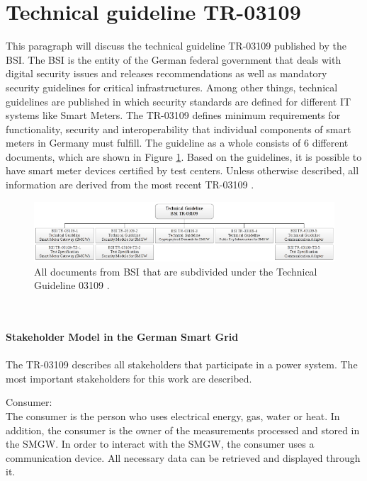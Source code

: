 \section{Technical guideline TR-03109}
\label{sec:TR_03109}
This paragraph will discuss the technical guideline \gls{TR-03109} published by the \gls{BSI}. The \gls{BSI} is the entity of the German federal government that deals with digital security issues and releases recommendations as well as mandatory security guidelines for critical infrastructures. Among other things, technical guidelines are published in which security standards are defined for different IT systems like Smart Meters. The \gls{TR-03109} defines minimum requirements for functionality, security and interoperability that individual components of smart meters in Germany must fulfill. The guideline as a whole consists of 6 different documents, which are shown in Figure \ref{fig:TG03109}. Based on the guidelines, it is possible to have smart meter devices certified by test centers. Unless otherwise described, all information are derived from the most recent \gls{TR-03109} \cite{TR-031}.\begin{figure}[tbp]
  \centering
  \includegraphics[width=1\textwidth]{images/BSI-TR-03109.png}
  \caption[Technical Guideline 03109 Overview]{All documents from \gls{BSI} that are subdivided under the Technical Guideline 03109 \cite{Anna}.}
  \label{fig:TG03109}
\end{figure}
\\%
\\
\textbf{Stakeholder Model in the German Smart Grid}
\label{subsec:stakeholder_model}
\\
\\
The \gls{TR-03109} describes all stakeholders that participate in a power system. The most important stakeholders for this work are described.
\\\item Consumer: \\
The consumer is the person who uses electrical energy, gas, water
or heat. In addition, the consumer is the owner of the measurements processed and stored in the \gls{SMGW}. In order to interact with the \gls{SMGW}, the consumer uses a communication device. All necessary data can be retrieved and displayed through it.\\
